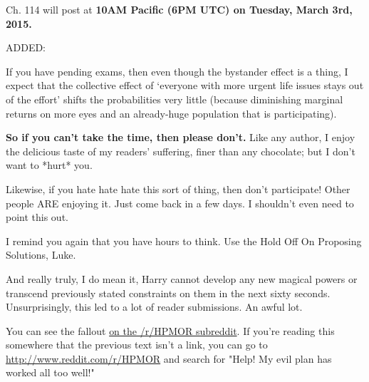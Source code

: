 \vspace*{.5\baselineskip}\noindent
Ch. 114 will post at \textbf{10AM Pacific (6PM UTC) on Tuesday, March
3rd, 2015.}

\vspace*{.5\baselineskip}\noindent
ADDED:

\vspace*{.5\baselineskip}\noindent
If you have pending exams,
then even though the bystander effect is a thing,
I expect that the collective effect of
`everyone with more urgent life issues stays out of the effort'
shifts the probabilities very little
(because diminishing marginal returns on more eyes
and an already-huge population that is participating).

\vspace*{.5\baselineskip}\noindent
\textbf{So if you can't take the time, then please don't.}
Like any author, I enjoy the delicious taste of my readers' suffering,
finer than any chocolate; but I don't want to *hurt* you.

\vspace*{.5\baselineskip}\noindent
Likewise, if you hate hate hate this sort of thing, then don't
participate!
Other people ARE enjoying it. Just come back in a few days.
I shouldn't even need to point this out.

\vspace*{.5\baselineskip}\noindent
I remind you again that you have hours to think.
Use the Hold Off On Proposing Solutions, Luke.

\vspace*{.5\baselineskip}\noindent
And really truly, I do mean it,
Harry cannot develop any new magical powers
or transcend previously stated constraints on them
in the next sixty seconds.
\sbreak
Unsurprisingly, this led to a lot of reader submissions. An awful lot.

You can see the
fallout \href{http://www.reddit.com/r/HPMOR/comments/2xnyi0/113_help_my_evil_plan_has_worked_all_too_well/}{on the /r/HPMOR subreddit}. 
If you're reading this somewhere that the previous text isn't a link, you 
can go to \url{http://www.reddit.com/r/HPMOR} and search for "Help! My evil plan has worked all too well!"
